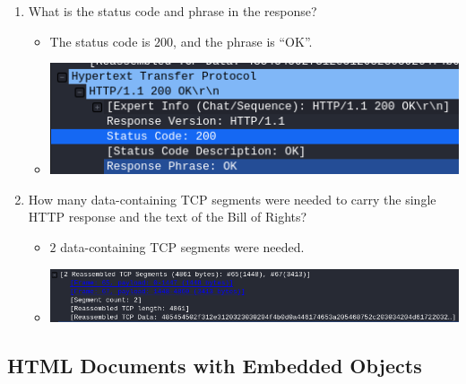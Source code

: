 \documentclass[11pt]{article}
\begin{document}
\begin{enumerate}
\begin{itemize}
  \end{itemize}
\item What is the status code and phrase in the response?
  \begin{itemize}
  \item The status code is $200$, and the phrase is ``OK''.
  \item \includegraphics[width=\textwidth]{img/ws-long-doc-status-code-phrase}
  \end{itemize}
\item How many data-containing TCP segments were needed to carry the single HTTP
  response and the text of the Bill of Rights?
  \begin{itemize}
  \item $2$ data-containing TCP segments were needed.
  \item \includegraphics[width=\textwidth]{img/ws-long-doc-tcp-count}
  \end{itemize}
\end{enumerate}

\subsection{HTML Documents with Embedded Objects}
\end{document}
